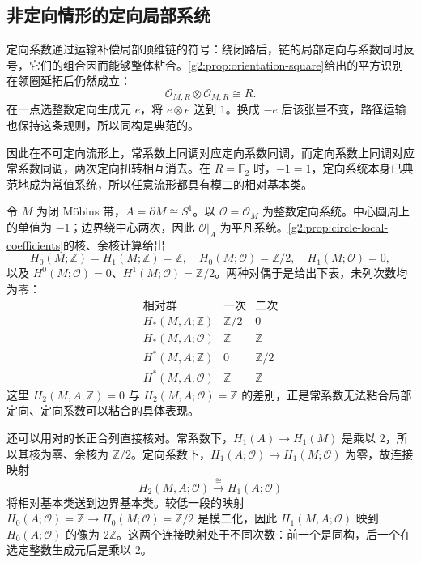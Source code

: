 \subsection{非定向情形的定向局部系统}
\label{g2:subsec:0604:03}
定向系数通过运输补偿局部顶维链的符号：绕闭路后，链的局部定向与系数同时反号，它们的组合因而能够整体粘合。\cref{g2:prop:orientation-square}给出的平方识别在领圈延拓后仍然成立：
\begin{equation}\label{g2:eq:boundary-orientation-square}
	\mathcal O_{M,R}\otimes\mathcal O_{M,R}\cong R.
\end{equation}
在一点选整数定向生成元 \(e\)，将 \(e\otimes e\) 送到 \(1\)。换成 \(-e\) 后该张量不变，路径运输也保持这条规则，所以同构是典范的。

\ProseParagraphBreak

因此在不可定向流形上，常系数上同调对应定向系数同调，而定向系数上同调对应常系数同调，两次定向扭转相互消去。在 \(R=\mathbb F_2\) 时，\(-1=1\)，定向系统本身已典范地成为常值系统，所以任意流形都具有模二的相对基本类。

\begin{example}\label{g2:exm:closed-moebius-duality}
	令 \(M\) 为闭 Möbius 带，\(A=\partial M\cong S^1\)。以 \(\mathcal O=\mathcal O_M\) 为整数定向系统。中心圆周上的单值为 \(-1\)；边界绕中心两次，因此 \(\mathcal O|_A\) 为平凡系统。\cref{g2:prop:circle-local-coefficients}的核、余核计算给出
	\[
		H_0(M;\mathbb Z)=H_1(M;\mathbb Z)=\mathbb Z,
		\quad H_0(M;\mathcal O)=\mathbb Z/2,
		\quad H_1(M;\mathcal O)=0,
	\]
	以及 \(H^0(M;\mathcal O)=0\)、\(H^1(M;\mathcal O)=\mathbb Z/2\)。两种对偶于是给出下表，未列次数均为零：
	\[
	\begin{array}{c|cc}
		\text{相对群}&\text{一次}&\text{二次}\\ \hline
		H_*(M,A;\mathbb Z)&\mathbb Z/2&0\\
		H_*(M,A;\mathcal O)&\mathbb Z&\mathbb Z\\
		H^*(M,A;\mathbb Z)&0&\mathbb Z/2\\
		H^*(M,A;\mathcal O)&\mathbb Z&\mathbb Z
	\end{array}
	\]
	这里 \(H_2(M,A;\mathbb Z)=0\) 与 \(H_2(M,A;\mathcal O)=\mathbb Z\) 的差别，正是常系数无法粘合局部定向、定向系数可以粘合的具体表现。

	还可以用对的长正合列直接核对。常系数下，\(H_1(A)\to H_1(M)\) 是乘以 \(2\)，所以其核为零、余核为 \(\mathbb Z/2\)。定向系数下，\(H_1(A;\mathcal O)\to H_1(M;\mathcal O)\) 为零，故连接映射
	\[
		H_2(M,A;\mathcal O)\xrightarrow{\ \cong\ }H_1(A;\mathcal O)
	\]
	将相对基本类送到边界基本类。较低一段的映射 \(H_0(A;\mathcal O)=\mathbb Z\to H_0(M;\mathcal O)=\mathbb Z/2\) 是模二化，因此 \(H_1(M,A;\mathcal O)\) 映到 \(H_0(A;\mathcal O)\) 的像为 \(2\mathbb Z\)。这两个连接映射处于不同次数：前一个是同构，后一个在选定整数生成元后是乘以 \(2\)。
\end{example}


